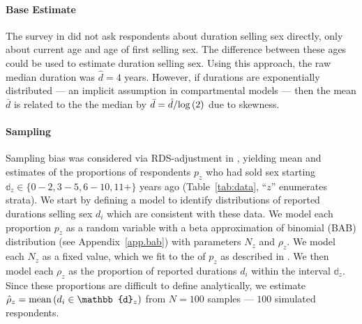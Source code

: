 \paragraph{Base Estimate}
The survey in \cite{Baral2014} did not ask respondents about duration selling sex directly,
only about current age and age of first selling sex.
The difference between these ages could be used to estimate duration selling sex.
Using this approach, the raw median duration was $\hat{d} = 4$ years.
However, if durations are exponentially distributed
--- an implicit assumption in compartmental models \cite{Anderson1991} ---
then the mean $\bar{d}$ is related to the the median by
$\bar{d} = \hat{d}/\mathrm{log}\,(2)$ due to skewness.
\paragraph{Sampling}
Sampling bias was considered via RDS-adjustment in \cite{Baral2014},
yielding mean and \ci estimates of the proportions of respondents $p_z$
who had sold sex starting $\mathbb{d}_z \in \{0{-}2, 3{-}5, 6{-}10, 11+\}$ years ago
(Table~\ref{tab:data}, ``$z$'' enumerates strata).
We start by defining a model to identify
distributions of reported durations selling sex $d_i$
which are consistent with these data.
We model each proportion $p_z$ as a random variable with
a beta approximation of binomial (BAB) distribution (see Appendix~\ref{app.bab})
with parameters $N_z$ and $\rho_z$.
We model each $N_z$ as a fixed value,
which we fit to the \ci of $p_z$ as described in .
We then model each $\rho_z$ as
the proportion of reported durations $d_i$ within the interval $\mathbb{d}_z$.
Since these proportions are difficult to define analytically,
we estimate $\hat{\rho}_z = \distr{mean}{d_i \in \mathbb{d}_z}$
from $N = 100$ samples --- \ie $100$ simulated respondents.
